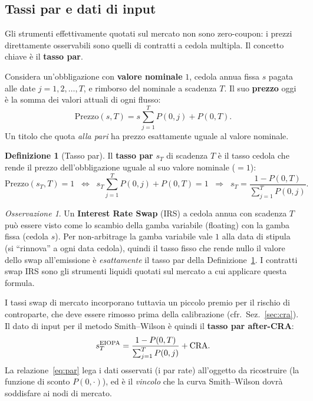 \documentclass[11pt,a4paper]{article}
\theoremstyle{plain}
\theoremstyle{definition}
\newtheorem{definizione}[teorema]{Definizione}
\theoremstyle{remark}
\newtheorem*{osservazione}{Osservazione}
\newcommand{\CRA}{\ensuremath{\mathrm{CRA}}}
\begin{document}
\subsection{Tassi par e dati di input}

Gli strumenti effettivamente quotati sul mercato non sono zero-coupon: i prezzi
direttamente osservabili sono quelli di contratti a cedola multipla. Il concetto chiave
\`e il \textbf{tasso par}.

Considera un'obbligazione con \textbf{valore nominale} $1$, cedola annua fissa $s$ pagata
alle date $j = 1, 2, \ldots, T$, e rimborso del nominale a scadenza $T$. Il suo
\textbf{prezzo} oggi \`e la somma dei valori attuali di ogni flusso:
\[
  \text{Prezzo}(s, T)
  = s \sum_{j=1}^{T} P(0,j) + P(0,T).
\]
Un titolo che quota \emph{alla pari} ha prezzo esattamente uguale al valore nominale.

\begin{definizione}[Tasso par]
\label{def:par}
Il \textbf{tasso par} $s_T$ di scadenza $T$ \`e il tasso cedola che rende il prezzo
dell'obbligazione uguale al suo valore nominale ($= 1$):
\[
  \text{Prezzo}(s_T, T) = 1
  \;\;\Longleftrightarrow\;\;
  s_T \sum_{j=1}^{T} P(0,j) + P(0,T) = 1
  \;\;\Longrightarrow\;\;
  s_T = \frac{1 - P(0,T)}{\displaystyle\sum_{j=1}^{T} P(0,j)}.
\]
\end{definizione}

\begin{osservazione}
Un \textbf{Interest Rate Swap} (IRS) a cedola annua con scadenza $T$ pu\`o essere visto
come lo scambio della gamba variabile (floating) con la gamba fissa (cedola $s$). Per
non-arbitrage la gamba variabile vale $1$ alla data di stipula (si ``rinnova'' a ogni data
cedola), quindi il tasso fisso che rende nullo il valore dello swap all'emissione \`e
\emph{esattamente} il tasso par della Definizione~\ref{def:par}. I contratti swap IRS sono
gli strumenti liquidi quotati sul mercato a cui applicare questa formula.
\end{osservazione}

I tassi swap di mercato incorporano tuttavia un piccolo premio per il rischio di
controparte, che deve essere rimosso prima della calibrazione (cfr.\ Sez.~\ref{sec:cra}).
Il dato di input per il metodo Smith--Wilson \`e quindi il \textbf{tasso par
after-CRA}:
\begin{equation}
  s_T^{\rm EIOPA} = \frac{1 - P(0,T)}{\sum_{j=1}^{T} P(0,j)} + \CRA .
  \label{eq:par}
\end{equation}
La relazione~\eqref{eq:par} lega i dati osservati (i par rate) all'oggetto da ricostruire
(la funzione di sconto $P(0,\cdot)$), ed \`e il \emph{vincolo} che la curva Smith--Wilson
dovr\`a soddisfare ai nodi di mercato.
\end{document}
